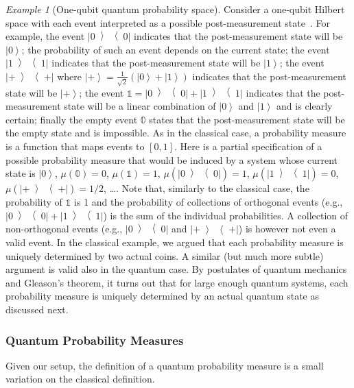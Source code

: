 \documentclass{article}
\theoremstyle{remark}
\newtheorem{example}{Example}\newtheorem{definition}{Definition}\newtheorem{thm}{Theorem}
\newcommand{\ket}[1]{{\left\vert{#1}\right\rangle}}
\newcommand{\op}[2]{\ensuremath{\left\vert{#1}\middle\rangle\middle\langle{#2}\right\vert}}
\newcommand{\proj}[1]{\op{#1}{#1}}
\newcommand{\ps}{\texttt{+}}
\begin{document}
\begin{example}[One-qubit quantum probability space]Consider a one-qubit
Hilbert space with each event interpreted as a possible post-measurement
state~\cite{peres1995quantum,Mermin2007,Jaeger2007}. For example,
the event $\proj{0}$ indicates that the post-measurement state will
be $\ket{0}$; the probability of such an event depends on the current
state; the event $\proj{1}$ indicates that the post-measurement state
will be $\ket{1}$; the event $\proj{\ps}$ where $\ket{\ps}=\frac{1}{\sqrt{2}}(\ket{0}+\ket{1})$
indicates that the post-measurement state will be $\ket{\ps}$; the
event $\mathbb{1}=\proj{0}+\proj{1}$ indicates that the post-measurement
state will be a linear combination of $\ket{0}$ and $\ket{1}$ and
is clearly certain; finally the empty event $\mathbb{0}$ states that
the post-measurement state will be the empty state and is impossible.
As in the classical case, a probability measure is a function that
maps events to $[0,1]$. Here is a partial specification of a possible
probability measure that would be induced by a system whose current
state is $\ket{0}$, $\mu\left(\mathbb{0}\right)=0$, $\mu\left(\mathbb{1}\right)=1$,
$\mu\left(\proj{0}\right)=1$, $\mu\left(\proj{1}\right)=0$, $\mu\left(\proj{\ps}\right)=1/2$,
\ldots{}. Note that, similarly to the classical case, the probability
of $\mathbb{1}$ is 1 and the probability of collections of orthogonal
events (e.g., $\proj{0}+\proj{1}$) is the sum of the individual probabilities.
A collection of non-orthogonal events (e.g., $\proj{0}$ and $\proj{\ps}$)
is however not even a valid event. In the classical example, we argued
that each probability measure is uniquely determined by two actual
coins. A similar (but much more subtle) argument is valid also in
the quantum case. By postulates of quantum mechanics and Gleason's
theorem, it turns out that for large enough quantum systems, each
probability measure is uniquely determined by an actual quantum state
as discussed next. \end{example}



\subsubsection{Quantum Probability Measures}

Given our setup, the definition of a quantum probability measure is
a small variation on the classical definition.
\end{document}
